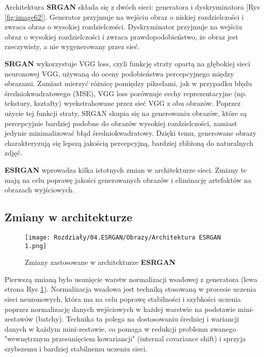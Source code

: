 Architektura \textbf{SRGAN} składa się z dwóch sieci: generatora i dyskryminatora [Rys \ref{fig:image62}]. Generator przyjmuje na wejściu obraz o niskiej rozdzielczości i zwraca obraz o wysokiej rozdzielczości. Dyskryminator przyjmuje na wejściu obraz o wysokiej rozdzielczości i zwraca prawdopodobieństwo, że obraz jest rzeczywisty, a nie wygenerowany przez sieć. 

\textbf{SRGAN} wykorzystuje VGG loss, czyli funkcję straty opartą na głębokiej sieci neuronowej VGG, używaną do oceny podobieństwa percepcyjnego między obrazami. Zamiast mierzyć różnicę pomiędzy pikselami, jak w przypadku błędu średniokwadratowego (MSE), VGG loss porównuje cechy reprezentacyjne (np. tekstury, kształty) wyekstrahowane przez sieć VGG z obu obrazów. Poprzez użycie tej funkcji straty, SRGAN skupia się na generowaniu obrazów, które są percepcyjnie bardziej podobne do obrazów wysokiej rozdzielczości, zamiast jedynie minimalizować błąd średniokwadratowy. Dzięki temu, generowane obrazy charakteryzują się lepszą jakością percepcyjną, bardziej zbliżoną do naturalnych zdjęć.



\textbf{ESRGAN} wprowadza kilka istotnych zmian w architekturze sieci. Zmiany te mają na celu poprawę jakości generowanych obrazów i eliminację artefaktów na obrazach wyjściowych.


\subsection*{Zmiany w architekturze}

\begin{figure}[ht]
    \centering
    \begin{minipage}[t]{0.85\linewidth}
        \texttt{[image: Rozdziały/04.ESRGAN/Obrazy/Architektura ESRGAN 1.png]}
        \caption{Zmiany zastosowane w architekturze \textbf{ESRGAN} \cite{wang2018esrgan}}
        \label{fig:image63}
    \end{minipage}
\end{figure}

Pierwszą zmianą było usunięcie warstw normalizacji wsadowej z generatora (lewa strona Rys \ref{fig:image63}). 
Normalizacja wsadowa jest techniką stosowaną w procesie uczenia sieci neuronowych, która ma na celu poprawę stabilności i szybkości uczenia poprzez normalizację danych wejściowych w każdej warstwie na podstawie mini-zestawów (batchy). Technika ta polega na dostosowaniu średniej i wariancji danych w każdym mini-zestawie, co pomaga w redukcji problemu zwanego "wewnętrznym przesunięciem kowariancji" (internal covariance shift) i sprzyja szybszemu i bardziej stabilnemu uczeniu sieci.

